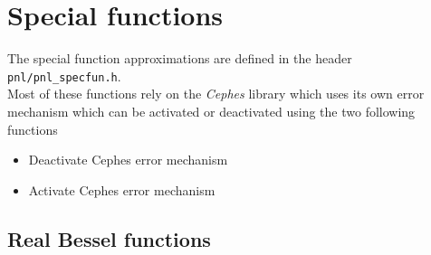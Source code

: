 
\section{Special functions}

The special function approximations are defined in the header \verb!pnl/pnl_specfun.h!.\\

Most of these functions rely on the {\it Cephes} library which uses its own
error mechanism which can be activated or deactivated using the two following
functions
\begin{itemize}
  \item {}
    \sshortdescribe Deactivate Cephes error mechanism
  \item {}
    \sshortdescribe Activate Cephes error mechanism
\end{itemize}


\subsection{Real Bessel functions}

